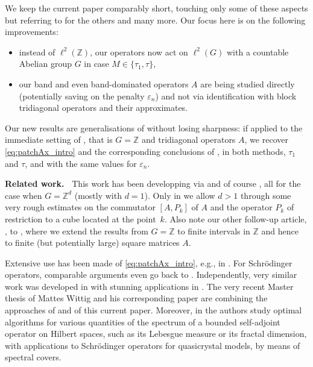 \documentclass{article}
\newcommand\Z{{\mathbb Z}}
\newcommand\eps{{\varepsilon}}
\numberwithin{equation}{section}   %
\numberwithin{figure}{section}  %
\begin{document}
We keep the current paper comparably short, touching only some of these aspects but referring to \cite{CW.Heng.ML:JST} for the others and many more. Our focus here is on the following improvements:
\begin{itemize} \itemsep-1mm
\item instead of $\ell^2(\Z)$, our operators now act on $\ell^2(G)$ with a countable Abelian group $G$ in case $M\in\{\tau_1,\tau\}$,
\item our band and even band-dominated operators $A$ are being studied directly (potentially saving on the penalty $\eps_n$) and not via identification with block tridiagonal operators and their approximates.
\end{itemize}
%
Our new results are generalisations of \cite{CW.Heng.ML:JST} without losing sharpness: if applied to the immediate setting of \cite{CW.Heng.ML:JST}, that is $G=\Z$ and tridiagonal operators $A$, we recover \eqref{eq:patchAx_intro} and the corresponding conclusions of \cite{CW.Heng.ML:JST}, in both methods, $\tau_1$ and $\tau$, and with the same values for $\eps_n$.


\medskip\noindent
{\bf Related work.\ }
This work has been developping via \cite{HengThesis,BigQuest,PAMM} and of course \cite{CW.Heng.ML:JST}, all for the case when $G=\Z^d$ (mostly with $d=1$). Only in \cite{BigQuest} we allow $d>1$ through some very rough estimates on the commutator $[A,P_k]$ of $A$ and the operator $P_k$ of restriction to a cube located at the point~$k$. Also note our other follow-up article, \cite{CW.ML:finite}, to \cite{CW.Heng.ML:JST}, where we extend the results from $G=\Z$ to finite intervals in $\Z$ and hence to finite (but potentially large) square matrices $A$.

 Extensive use has been made of \eqref{eq:patchAx_intro}, e.g., in \cite{TriRand,BigQuest}. For Schrödinger operators, comparable arguments even go back to \cite{Elliot,AvronMoucheSimon}. Independently, very similar work was developed in \cite{HegeThesis,Hege24} with stunning applications in \cite{Hege22,HegeThesis}. The very recent Master thesis \cite{WittigMSc} of Mattes Wittig and his corresponding paper \cite{Wittig26} are combining the approaches of \cite{HegeThesis,Hege24} and of this current paper. Moreover, in \cite{ColbrookEmbreeFillman2024} the authors study optimal algorithms for various quantities of the spectrum of a bounded self-adjoint operator on Hilbert spaces, such as its Lebesgue measure or its fractal dimension, with applications to Schr\"odinger operators for quasicrystal models, by means of spectral covers.
\end{document}
